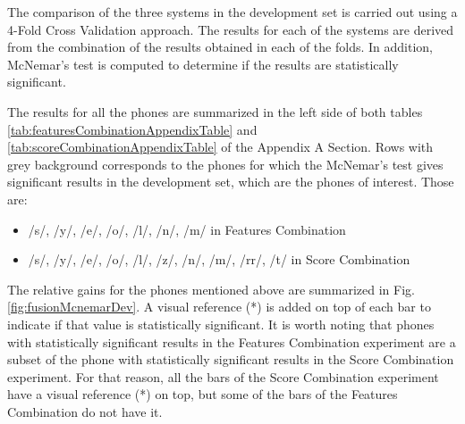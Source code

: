 The comparison of the three systems
in the development set is carried out using a 4-Fold Cross Validation
approach. The results for each of
the systems are derived from the combination of the
results obtained in each of the folds.
In addition, McNemar's test is computed to determine if the
results are statistically significant.

The results for all the phones are summarized in the left side of both tables
\ref{tab:featuresCombinationAppendixTable} and \ref{tab:scoreCombinationAppendixTable}
of the Appendix A Section. Rows with grey background corresponds to the phones for which
the McNemar's test gives significant results in the development set, which are the
phones of interest. Those are:

\begin{itemize}
	\item /s/, /y/, /e/, /o/, /l/, /n/, /m/ in Features Combination
	\item /s/, /y/, /e/, /o/, /l/, /z/, /n/, /m/, /rr/, /t/ in Score Combination
\end{itemize}

The relative gains for the phones mentioned above are summarized in
Fig. \ref{fig:fusionMcnemarDev}.
A visual reference (*) is added on top of each bar to indicate if that value
is statistically significant.
It is worth noting that phones with statistically significant results in the Features
Combination experiment are a subset of the phone with statistically significant results in the
Score Combination experiment. For that reason, all the bars of the Score Combination experiment
have a visual reference (*) on top, but some of the bars of the Features Combination do not
have it.


